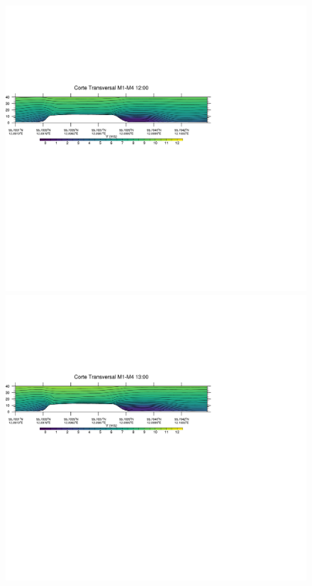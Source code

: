 \begin{figure}[H]
	\centering
	\includegraphics[width=0.90\linewidth,trim={0mm 202.0mm 111mm 106mm},clip]{Imagenes/06/bol/1200rot}\\%
	\includegraphics[width=0.90\linewidth,trim={0mm 202.0mm 111mm 106mm},clip]{Imagenes/06/bol/1300rot}\\%

\end{figure}
